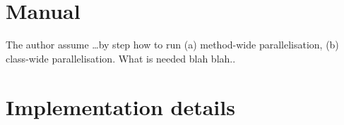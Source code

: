 






\chapter{Manual}
\label{30:appendix:a}

The author assume \dots by step how to run (a) method-wide parallelisation, (b) class-wide parallelisation.
What is needed blah blah..

\chapter{Implementation details}
\label{30:appendix:b}

